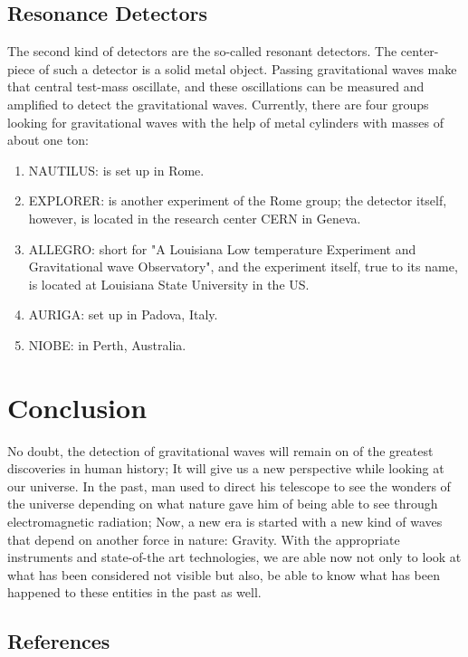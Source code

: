 \documentclass[11]{article}
\begin{document}
\subsection{Resonance Detectors}
The second kind of detectors are the so-called resonant detectors. The center-piece of such a detector is a solid metal object. Passing gravitational waves make that central test-mass oscillate, and these oscillations can be measured and amplified to detect the gravitational waves. Currently, there are four groups looking for gravitational waves with the help of metal cylinders with masses of about one ton:
\begin{enumerate}

\item NAUTILUS: is set up in Rome.

\item EXPLORER: is another experiment of the Rome group; the detector itself, however, is located in the research center CERN in Geneva.

\item ALLEGRO: short for "A Louisiana Low temperature Experiment and Gravitational wave Observatory", and the experiment itself, true to its name, is located at Louisiana State University in the US.

\item AURIGA: set up in Padova, Italy.

\item NIOBE: in Perth, Australia.
\end{enumerate}
\newpage
\section{Conclusion}
No doubt, the detection of gravitational waves will remain on of the greatest discoveries in human history; It will give us a new perspective while looking at our universe. In the past, man used to direct his telescope to see the wonders of the universe depending on what nature gave him of being able to see through electromagnetic radiation; Now, a new era is started with a new kind of waves that depend on another force in nature: Gravity. With the appropriate instruments and state-of-the art technologies, we are able now not only to look at what has been considered not visible but also, be able to know what has been happened to these entities in the past as well.

\newpage

\begin{center}\section{References}\end{center}
\end{document}
